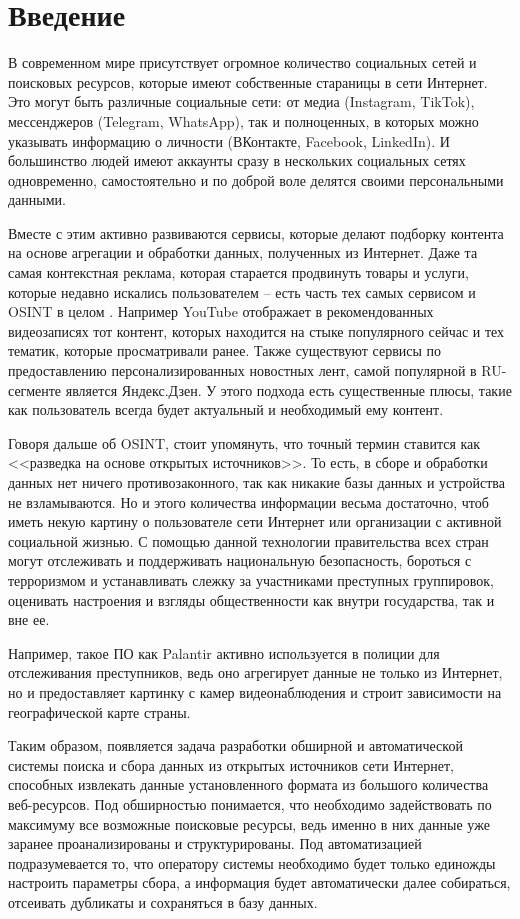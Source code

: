 \section{Введение}
\label{sec:Chapter0} 
В современном мире присутствует огромное количество социальных сетей и поисковых ресурсов, которые имеют собственные стараницы в 
сети Интернет. Это могут быть различные социальные сети: от медиа (Instagram, TikTok), мессенджеров (Telegram, WhatsApp), так
и полноценных, в которых можно указывать информацию о личности (ВКонтакте, Facebook, LinkedIn). И большинство людей имеют аккаунты
сразу в нескольких социальных сетях одновременно, самостоятельно и по доброй воле делятся своими персональными данными.
\par
Вместе с этим активно развиваются сервисы, которые делают подборку контента на основе агрегации и обработки данных, полученных
из Интернет. Даже та самая контекстная реклама, которая старается продвинуть товары и услуги, которые недавно искались пользователем -- 
есть часть тех самых сервисом и OSINT в целом \cite{yushchuk}. Например YouTube отображает в рекомендованных видеозаписях тот контент,
которых находится на стыке популярного сейчас и тех тематик, которые просматривали ранее. Также существуют сервисы по предоставлению
персонализированных новостных лент, самой популярной в RU-сегменте является Яндекс.Дзен. У этого подхода есть существенные плюсы, 
такие как пользователь всегда будет актуальный и необходимый ему контент.
\par
Говоря дальше об OSINT, стоит упомянуть, что точный термин ставится как <<разведка на основе открытых источников>>. То есть, в 
сборе и обработки данных нет ничего противозаконного, так как никакие базы данных и устройства не взламываются. Но и этого количества
информации весьма достаточно, чтоб иметь некую картину о пользователе сети Интернет или организации с активной социальной жизнью.
С помощью данной технологии правительства всех стран могут отслеживать и поддерживать национальную безопасность, бороться с 
терроризмом и устанавливать слежку за участниками преступных группировок, оценивать настроения и взгляды общественности как внутри
государства, так и вне ее.
\par
Например, такое ПО как Palantir активно используется в полиции для отслеживания преступников, ведь оно агрегирует данные не только из Интернет,
но и предоставляет картинку с камер видеонаблюдения и строит зависимости на географической карте страны.
\par
Таким образом, появляется задача разработки обширной и автоматической системы поиска и сбора данных из открытых источников сети Интернет, 
способных извлекать данные установленного формата из большого количества веб-ресурсов. Под обширностью понимается, что необходимо
задействовать по максимуму все возможные поисковые ресурсы, ведь именно в них данные уже заранее проанализированы и структурированы.
Под автоматизацией подразумевается то, что оператору системы необходимо будет только единожды настроить параметры сбора, а информация
будет автоматически далее собираться, отсеивать дубликаты и сохраняться в базу данных.


